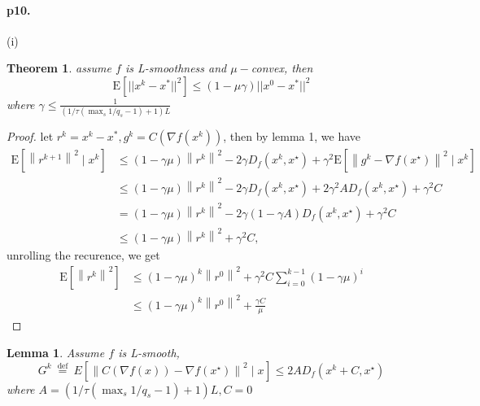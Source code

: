 \documentclass[8pt,a4paper]{article}
\newtheorem{lemma}{Lemma}
\newtheorem{theorem}{Theorem}
\begin{document}
	\paragraph{p10.}
	(i)\begin{theorem}
		assume $f$ is L-smoothness and $\mu-$convex, then 
		\begin{equation*}
			\mathrm{E}[||x^k-x^*||^2]\leq (1-\mu\gamma)||x^0-x^*||^2
		\end{equation*}
	 where $\gamma\leq \frac{1}{(1/\tau(\max_s 1/q_s-1)+1)L}$
	\end{theorem}
\begin{proof}
	let $r^k=x^k-x^*,g^k=C(\nabla f(x^k))$, then by lemma 1, we have \begin{equation}
		\begin{aligned}
			\mathrm{E}\left[\left\|r^{k+1}\right\|^{2} \mid x^{k}\right] & \stackrel{}{\leq}(1-\gamma \mu)\left\|r^{k}\right\|^{2}-2 \gamma D_{f}\left(x^{k}, x^{\star}\right)+\gamma^{2} \mathrm{E}\left[\left\|g^{k}-\nabla f\left(x^{\star}\right)\right\|^{2} \mid x^{k}\right] \\
			& \stackrel{}{\leq}(1-\gamma \mu)\left\|r^{k}\right\|^{2}-2 \gamma D_{f}\left(x^{k}, x^{\star}\right)+2 \gamma^{2} A D_{f}\left(x^{k}, x^{\star}\right)+\gamma^{2} C \\
			&=(1-\gamma \mu)\left\|r^{k}\right\|^{2}-2 \gamma(1-\gamma A) D_{f}\left(x^{k}, x^{\star}\right)+\gamma^{2} C \\
			& \leq(1-\gamma \mu)\left\|r^{k}\right\|^{2}+\gamma^{2} C,
		\end{aligned}
	\end{equation}
unrolling the recurence, we get 
\begin{equation}
	\begin{aligned}
		\mathrm{E}\left[\left\|r^{k}\right\|^{2}\right] & \leq(1-\gamma \mu)^{k}\left\|r^{0}\right\|^{2}+\gamma^{2} C \sum_{i=0}^{k-1}(1-\gamma \mu)^{i} \\
		& \leq(1-\gamma \mu)^{k}\left\|r^{0}\right\|^{2}+\frac{\gamma C}{\mu}
	\end{aligned}
\end{equation}

\end{proof}
\begin{lemma}
	Assume $f$ is L-smooth,
	$$
	G^{k} \stackrel{\text { def }}{=} E\left[\left\|C(\nabla f(x))-\nabla f\left(x^{\star}\right)\right\|^{2} \mid x^{}\right] \leq 2A D_{f}\left(x^{k}+C, x^{\star}\right)
	$$
	where $A=(1/\tau(\max_s 1/q_s-1)+1)L,C=0$
\end{lemma}
\end{document}
